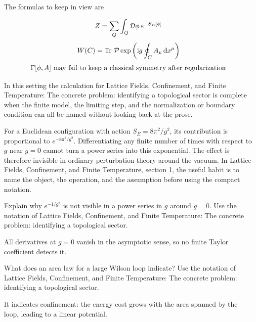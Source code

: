 The formulas to keep in view are

\[
  Z=\sum_Q\int_Q\mathcal D\phi\,e^{-S_E[\phi]}
\]
\[
  W(C)=\operatorname{Tr}\,\mathcal P\exp\left(\mathrm i g\oint_C A_\mu\,\mathrm d x^\mu\right)
\]
\[
  \Gamma[\phi,A]\hbox{ may fail to keep a classical symmetry after regularization}
\]

In this setting the calculation for Lattice Fields, Confinement, and Finite Temperature: The concrete problem: identifying a topological sector is complete when the finite model, the limiting step, and the normalization or boundary condition can all be named without looking back at the prose.




\begin{example}
For a Euclidean configuration with action \(S_E=8\pi^2/g^2\), its contribution is proportional to \(e^{-8\pi^2/g^2}\).  Differentiating any finite number of times with respect to \(g\) near \(g=0\) cannot turn a power series into this exponential.  The effect is therefore invisible in ordinary perturbation theory around the vacuum.  In Lattice Fields, Confinement, and Finite Temperature, section 1, the useful habit is to name the object, the operation, and the assumption before using the compact notation.
\end{example}



\begin{exercise}
Explain why \(e^{-1/g^2}\) is not visible in a power series in \(g\) around \(g=0\).  Use the notation of Lattice Fields, Confinement, and Finite Temperature: The concrete problem: identifying a topological sector.
\begin{answer}
All derivatives at \(g=0\) vanish in the asymptotic sense, so no finite Taylor coefficient detects it.
\end{answer}
\end{exercise}

\begin{exercise}
What does an area law for a large Wilson loop indicate?  Use the notation of Lattice Fields, Confinement, and Finite Temperature: The concrete problem: identifying a topological sector.
\begin{answer}
It indicates confinement: the energy cost grows with the area spanned by the loop, leading to a linear potential.
\end{answer}
\end{exercise}



